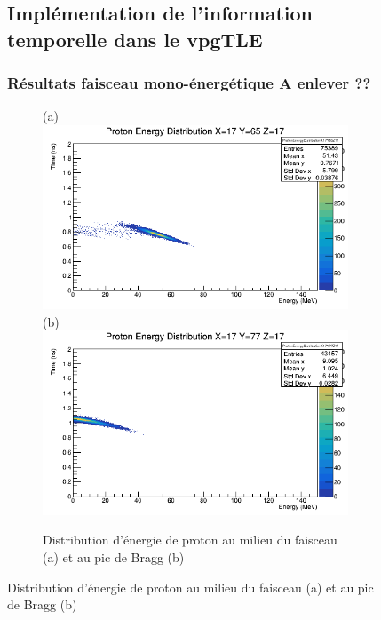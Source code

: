 \documentclass[11pt,a4paper,oldfontcommands]{memoir}
\begin{document}
\begin{figure}
\subsection{Implémentation de l'information temporelle dans le vpgTLE}





\newpage

\appendix

\subsubsection{Résultats faisceau mono-énergétique A enlever ??}
\begin{figure}[h!]
\centering
\subfloat(a){\includegraphics[scale=0.37]{CT/130/FaisceauProt.png}}
\subfloat(b){\includegraphics[scale=0.37]{CT/130/BraggProt.png}}
\caption{Distribution d'énergie de proton au milieu du faisceau (a) et au pic de Bragg (b)}
\label{130 prot}
\end{figure}


\end{figure}
\end{document}
